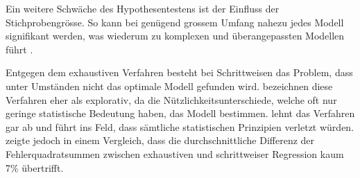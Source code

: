 Ein weitere Schwäche des Hypothesentestens ist der Einfluss der Stichprobengrösse. So kann bei genügend grossem Umfang nahezu jedes Modell  signifikant werden, was wiederum zu komplexen und überangepassten Modellen führt \cite[p.173]{weakliem2004introduction}.

Entgegen dem exhaustiven Verfahren besteht bei Schrittweisen das Problem, dass unter Umständen nicht das optimale Modell gefunden wird. 
 bezeichnen diese Verfahren eher als explorativ, da die Nützlichkeitsunterschiede, welche oft nur geringe statistische Bedeutung haben, das Modell bestimmen.
 lehnt das Verfahren gar ab und führt ins Feld, dass sämtliche statistischen Prinzipien verletzt würden. 
 zeigte jedoch in einem Vergleich, dass die durchschnittliche Differenz der Fehlerquadratsummen zwischen exhaustiven und schrittweiser Regression kaum 7\% übertrifft. 